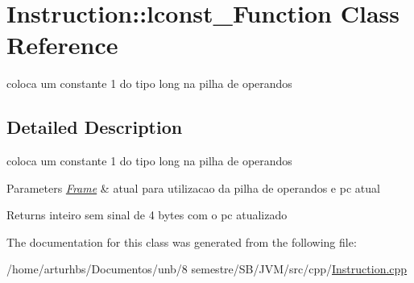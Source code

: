 \hypertarget{classInstruction_1_1lconst__1Function}{}\section{Instruction\+:\+:lconst\+\_\+Function Class Reference}
\label{classInstruction_1_1lconst__1Function}


coloca um constante 1 do tipo long na pilha de operandos  




\subsection{Detailed Description}
coloca um constante 1 do tipo long na pilha de operandos 


\begin{DoxyParams}{Parameters}
{\em \hyperlink{classFrame}{Frame}} & atual para utilizacao da pilha de operandos e pc atual \\
\hline
\end{DoxyParams}
\begin{DoxyReturn}{Returns}
inteiro sem sinal de 4 bytes com o pc atualizado 
\end{DoxyReturn}


The documentation for this class was generated from the following file\+:\begin{DoxyCompactItemize}
\item 
/home/arturhbs/\+Documentos/unb/8 semestre/\+S\+B/\+J\+V\+M/src/cpp/\hyperlink{Instruction_8cpp}{Instruction.\+cpp}\end{DoxyCompactItemize}
